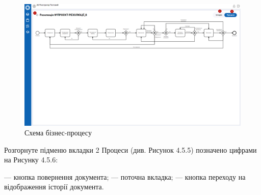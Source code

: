 \begin{figure}[!htbp]
\centerline{\includegraphics[width=\textwidth]{img/4.5.6.png}}
\caption{Схема бізнес-процесу}
\end{figure}

Розгорнуте підменю вкладки 2 Процеси (див. Рисунок 4.5.5) позначено цифрами на Рисунку 4.5.6:

 --- кнопка повернення документа;
 --- поточна вкладка;
 --- кнопка переходу на відображення історії документа.

